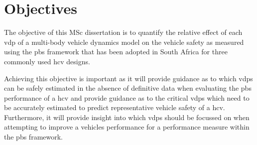 \chapter{Objectives}\label{section:objectives}

The objective of this MSc dissertation is to quantify the relative effect of each \gls{vdp} of a multi-body vehicle dynamics model on the vehicle safety as measured using the \gls{pbs} framework that has been adopted in South Africa for three commonly used \gls{hcv} designs.

Achieving this objective is important as it will provide guidance as to which \glspl{vdp} can be safely estimated in the absence of definitive data when evaluating the \gls{pbs} performance of a \gls{hcv} and provide guidance as to the critical \glspl{vdp} which need to be accurately estimated to predict representative vehicle safety of a \gls{hcv}. Furthermore, it will provide insight into which \glspl{vdp} should be focussed on when attempting to improve a vehicles performance for a performance measure within the \gls{pbs} framework.